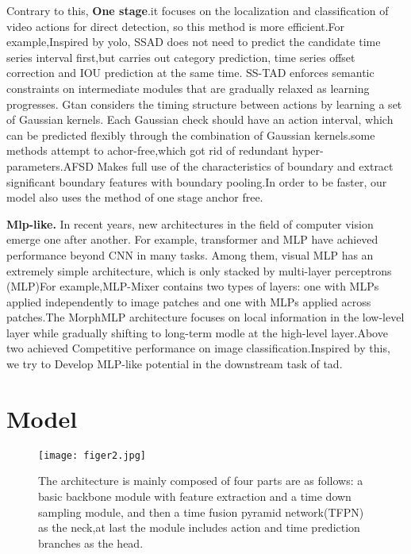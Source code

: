 \documentclass[10pt,twocolumn,letterpaper]{article}
\begin{document}
Contrary to this,
\textbf{One stage}.it focuses on the localization and classification of video actions for direct detection, so this method is more efficient.For example,Inspired by yolo\cite{DBLP:conf/cvpr/RedmonF17}, SSAD\cite{DBLP:conf/mm/LinZS17} does not need to predict the candidate time series interval first,but carries out category prediction, time series offset correction and IOU prediction at the same time. SS-TAD\cite{BMVC2017_93} enforces semantic constraints on intermediate modules that are gradually relaxed as learning progresses. Gtan\cite{DBLP:conf/cvpr/LongYQTLM19} considers the timing structure between actions by learning a set of Gaussian kernels. Each Gaussian check should have an action interval, which can be predicted flexibly through the combination of Gaussian kernels.some methods attempt to achor-free,which got rid of redundant hyper-parameters.AFSD\cite{DBLP:conf/cvpr/Lin0LWTWLHF21} Makes full use of the characteristics of boundary and extract significant boundary features with boundary pooling.In order to be faster, our model also uses the method of one stage anchor free.

\textbf{Mlp-like.} In recent years, new architectures in the field of computer vision emerge one after another. For example, transformer and MLP have achieved performance beyond CNN in many tasks. Among them, visual MLP has an extremely simple architecture, which is only stacked by multi-layer perceptrons (MLP)For example,MLP-Mixe\cite{DBLP:conf/cvpr/Lin0LWTWLHF21}r contains two types of layers: one with MLPs applied independently to image patches and one with MLPs applied across patches.The MorphMLP\cite{DBLP:journals/corr/abs-2111-12527} architecture focuses on local information in the low-level layer while gradually shifting to long-term modle at the high-level layer.Above two achieved Competitive performance on image classification.Inspired by this, we try to Develop MLP-like potential in the downstream task of tad.
\section{Model}
\begin{figure*}
  \centering
\texttt{[image: figer2.jpg]}
    \caption{The architecture is mainly composed of four parts are as follows: a basic backbone module with feature extraction and a time down sampling module, and then a time fusion pyramid network(TFPN) as the neck,at last the module includes action and time prediction branches as the head.}
    \label{fig2}

\end{figure*}
\end{document}
